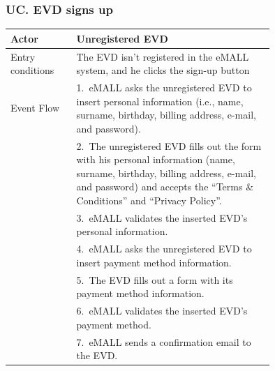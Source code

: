 \subsubsection*{UC\cuc . EVD signs up}
\begin{center}
    \begin{longtable}{lp{0.75\linewidth}}
        \hline
        Actor            & Unregistered EVD                                                                                                                                                                                       \\
        \hline
        Entry conditions & The EVD isn’t registered in the eMALL system, and he clicks the sign-up button                                                                                                                         \\
        \hline
        Event Flow       & 1.\ eMALL asks the unregistered EVD to insert personal information (i.e., name, surname, birthday, billing address, e-mail, and password).                                                             \\
        & 2.\ The unregistered EVD fills out the form with his personal information (name, surname, birthday, billing address, e-mail, and password) and accepts the “Terms \& Conditions” and “Privacy Policy”. \\
        & 3.\ eMALL validates the inserted EVD’s personal information.                                                                                                                                           \\
        & 4.\ eMALL asks the unregistered EVD to insert payment method information.                                                                                                                              \\
        & 5.\ The EVD fills out a form with its payment method information.                                                                                                                                      \\
        & 6.\ eMALL validates the inserted EVD’s payment method.                                                                                                                                                 \\
        & 7.\ eMALL sends a confirmation email to the EVD.                                                                                                                                                       \\

\end{longtable}
\end{center}
